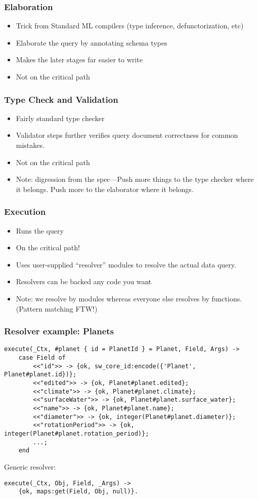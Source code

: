 \documentclass[lualatex]{beamer}
\begin{document}
\begin{frame}
  \frametitle{Elaboration}
  \begin{itemize}
  \item Trick from Standard ML compilers (type inference,
    defunctorization, etc)
  \item Elaborate the query by annotating schema types
  \item Makes the later stages far easier to write
  \item Not on the critical path
  \end{itemize}
\end{frame}

\begin{frame}
  \frametitle{Type Check and Validation}
  \begin{itemize}
  \item Fairly standard type checker
  \item Validator steps further verifies query document correctness
    for common mistakes.
  \item Not on the critical path
  \item Note: digression from the spec---Push more things to the type
    checker where it belongs. Push more to the elaborator where it belongs.
  \end{itemize}
\end{frame}

\begin{frame}
  \frametitle{Execution}
  \begin{itemize}
  \item Runs the query
  \item On the critical path!
  \item Uses user-supplied ``resolver'' modules to resolve the
    actual data query.
  \item Resolvers can be backed any code you want
  \item Note: we resolve by modules whereas everyone else resolves by
    functions. (Pattern matching FTW!)
  \end{itemize}
\end{frame}

\begin{frame}
  \frametitle{Resolver example: Planets}
\begin{verbatim}
execute(_Ctx, #planet { id = PlanetId } = Planet, Field, Args) ->
    case Field of
        <<"id">> -> {ok, sw_core_id:encode({'Planet', Planet#planet.id})};
        <<"edited">> -> {ok, Planet#planet.edited};
        <<"climate">> -> {ok, Planet#planet.climate};
        <<"surfaceWater">> -> {ok, Planet#planet.surface_water};
        <<"name">> -> {ok, Planet#planet.name};
        <<"diameter">> -> {ok, integer(Planet#planet.diameter)};
        <<"rotationPeriod">> -> {ok, integer(Planet#planet.rotation_period)};
        ...;
    end
\end{verbatim}
  Generic resolver:
\begin{verbatim}
execute(_Ctx, Obj, Field, _Args) ->
    {ok, maps:get(Field, Obj, null)}.
\end{verbatim}
\end{frame}
\end{document}
